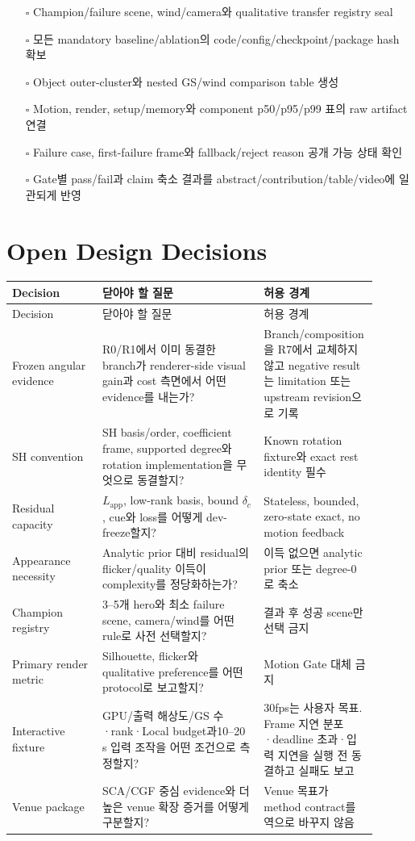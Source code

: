 \documentclass[10pt]{article}
\begin{document}
\begin{itemize}
  \item[$\square$] Champion/failure scene, wind/camera와 qualitative transfer registry seal
  \item[$\square$] 모든 mandatory baseline/ablation의 code/config/checkpoint/package hash 확보
  \item[$\square$] Object outer-cluster와 nested GS/wind comparison table 생성
  \item[$\square$] Motion, render, setup/memory와 component p50/p95/p99 표의 raw artifact 연결
  \item[$\square$] Failure case, first-failure frame와 fallback/reject reason 공개 가능 상태 확인
  \item[$\square$] Gate별 pass/fail과 claim 축소 결과를 abstract/contribution/table/video에 일관되게 반영
\end{itemize}

\section{Open Design Decisions}
\label{sec:r7-chapter-5}

\begin{longtable}{L{0.24\linewidth}L{0.43\linewidth}L{0.23\linewidth}}
\toprule
Decision & 닫아야 할 질문 & 허용 경계\\
\midrule
\endfirsthead
\toprule
Decision & 닫아야 할 질문 & 허용 경계\\
\midrule
\endhead
Frozen angular evidence & R0/R1에서 이미 동결한 branch가 renderer-side visual gain과 cost 측면에서 어떤 evidence를 내는가? & Branch/composition을 R7에서 교체하지 않고 negative result는 limitation 또는 upstream revision으로 기록\\
SH convention & SH basis/order, coefficient frame, supported degree와 rotation implementation을 무엇으로 동결할지? & Known rotation fixture와 exact rest identity 필수\\
Residual capacity & \(L_{\mathrm{app}}\), low-rank basis, bound \(\delta_c\), cue와 loss를 어떻게 dev-freeze할지? & Stateless, bounded, zero-state exact, no motion feedback\\
Appearance necessity & Analytic prior 대비 residual의 flicker/quality 이득이 complexity를 정당화하는가? & 이득 없으면 analytic prior 또는 degree-0로 축소\\
Champion registry & 3--5개 hero와 최소 failure scene, camera/wind를 어떤 rule로 사전 선택할지? & 결과 후 성공 scene만 선택 금지\\
Primary render metric & Silhouette, flicker와 qualitative preference를 어떤 protocol로 보고할지? & Motion Gate 대체 금지\\
Interactive fixture & GPU/출력 해상도/GS 수·rank·Local budget과10--20 s 입력 조작을 어떤 조건으로 측정할지? & 30fps는 사용자 목표. Frame 지연 분포·deadline 초과·입력 지연을 실행 전 동결하고 실패도 보고\\
Venue package & SCA/CGF 중심 evidence와 더 높은 venue 확장 증거를 어떻게 구분할지? & Venue 목표가 method contract를 역으로 바꾸지 않음\\
\bottomrule
\end{longtable}
\end{document}
